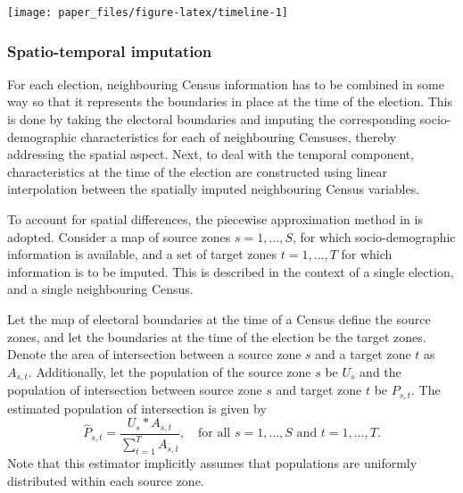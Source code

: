\documentclass[times, doublespace]{anzsauth}
\let\origfigure\figure
\let\endorigfigure\endfigure
\renewenvironment{figure}[1][2] {
    \expandafter\origfigure\expandafter[htbp]
} {
    \endorigfigure
}
\begin{document}
\begin{figure}[h]

{\centering \texttt{[image: paper\_files/figure-latex/timeline-1]} 

}

\caption{Timeline of Australian elections and Censuses. They do not always occur in the same year.}\label{fig:timeline}
\end{figure}

\hypertarget{spatio-temporal-imputation}{%
\subsubsection*{Spatio-temporal imputation}\label{spatio-temporal-imputation}}

For each election, neighbouring Census information has to be combined in some way so that it represents the boundaries in place at the time of the election. This is done by taking the electoral boundaries and imputing the corresponding socio-demographic characteristics for each of neighbouring Censuses, thereby addressing the spatial aspect. Next, to deal with the temporal component, characteristics at the time of the election are constructed using linear interpolation between the spatially imputed neighbouring Census variables.

To account for spatial differences, the piecewise approximation method in \citet{Goodchild1993} is adopted. Consider a map of source zones \(s = 1,\dots,S\), for which socio-demographic information is available, and a set of target zones \(t = 1,\dots,T\) for which information is to be imputed. This is described in the context of a single election, and a single neighbouring Census.

Let the map of electoral boundaries at the time of a Census define the source zones, and let the boundaries at the time of the election be the target zones. Denote the area of intersection between a source zone \(s\) and a target zone \(t\) as \(A_{s,t}\). Additionally, let the population of the source zone \(s\) be \(U_s\) and the population of intersection between source zone \(s\) and target zone \(t\) be \(P_{s,t}\). The estimated population of intersection is given by
\[
  \hat{P}_{s,t} = \frac{U_s*A_{s,t}}{\sum_{t=1}^T A_{s,t}},
  \quad\text{for all $s=1,\dots,S$ and $t=1,\dots,T$}.
\]
Note that this estimator implicitly assumes that populations are uniformly distributed within each source zone.
\end{document}
